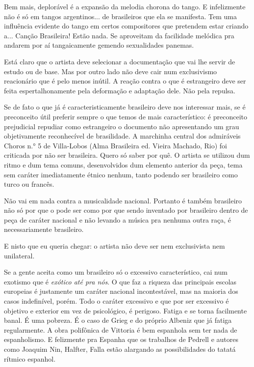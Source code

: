Bem mais, deplorável é a expansão da melodia chorona do tango. E
infelizmente não é só em tangos argentinos... de brasileiros que ela se
manifesta. Tem uma influência evidente do tango em certos compositores
que pretendem estar criando a... Canção Brasileira! Estão nada. Se
aproveitam da facilidade melódica pra andarem por aí tangaicamente
gemendo sexualidades panemas.~

Está claro que o artista deve selecionar a documentação que vai lhe
servir de estudo ou de base. Mas por outro lado não deve cair num
exclusivismo reacionário que é pelo menos inútil. A reação contra o que
é estrangeiro deve ser feita espertalhonamente pela deformação e
adaptação dele. Não pela repulsa.

Se de fato o que já é caracteristicamente brasileiro deve nos interessar
mais, se é preconceito útil preferir sempre o que temos de mais
característico: é preconceito prejudicial repudiar como estrangeiro o
documento não apresentando um grau objetivamente reconhecível de
brasilidade. A marchinha central dos admiráveis Choros n.° 5 de
Villa-Lobos (Alma Brasileira ed. Vieira Machado, Rio) foi criticada por
não ser brasileira. Quero só saber por quê. O artista se utilizou dum
ritmo e dum tema comuns, desenvolvidos dum elemento anterior da peça,
tema sem caráter imediatamente étnico nenhum, tanto podendo ser
brasileiro como turco ou francês.~

Não vai em nada contra a musicalidade nacional. Portanto é também
brasileiro não só por que o pode ser como por que sendo inventado por
brasileiro dentro de peça de caráter nacional e não levando a música pra
nenhuma outra raça, é necessariamente brasileiro.

E nisto que eu queria chegar: o artista não deve ser nem exclusivista
nem unilateral.

Se a gente aceita como um brasileiro só o excessivo característico, cai
num exotismo que é \emph{exótico até pra nós}. O que faz a riqueza das
principais escolas europeias é justamente um caráter nacional
incontestável, mas na maioria dos casos indefinível, porém. Todo o
caráter excessivo e que por ser excessivo é objetivo e exterior em vez
de psicológico, é perigoso. Fatiga e se torna facilmente banal. É uma
pobreza. É o caso de Grieg e do próprio Albeniz que já fatiga
regularmente. A obra polifônica de Vittoria é bem espanhola sem ter nada
de espanholismo. E felizmente pra Espanha que os trabalhos de Pedrell e
autores como Joaquim Nin, Halfter, Falla estão alargando as
possibilidades do tatatá rítmico espanhol.~

